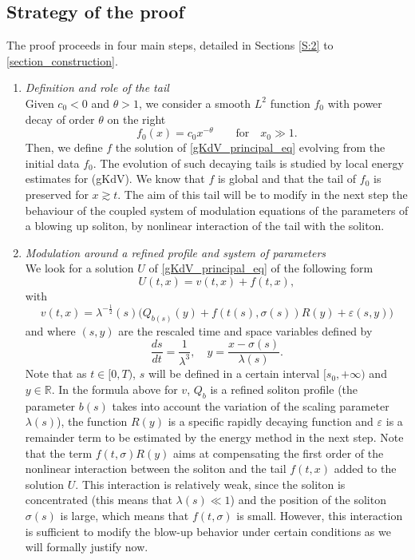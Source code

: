 \documentclass[16pt,english, oneside,reqno]{smfart}
\newcommand{\RR}{\mathbb{R}}
\newcommand{\vare}{{\varepsilon}}
\begin{document}
\subsection{Strategy of the proof}\label{S:strategy}
The proof proceeds in four main steps, detailed in Sections \ref{S:2} to \ref{section_construction}.
\begin{enumerate}
    \item \textit{Definition and role of the tail}\\
    Given $c_0 < 0$ and $\theta > 1$, we consider a smooth $L^2$ function $f_0$ with power decay of order $\theta$ on the right
    \begin{equation}
        f_0(x) = c_0 x^{-\theta} \qquad \text{for}\quad x_0 \gg1.
    \end{equation}
 Then, we define $f$ the solution of \eqref{gKdV_principal_eq} evolving from the initial data $f_0$. The evolution of such decaying tails is studied by local energy estimates for (gKdV). 
 We know that $f$ is global and that the tail of $f_0$ is preserved for $x \gtrsim t$. 
 The aim of this tail will be to modify in the next step the behaviour of the coupled system of modulation equations of the parameters of a blowing up soliton, by nonlinear interaction
 of the tail with the soliton.
 
    \item \textit{Modulation around a refined profile and system of parameters}\\
    We look for a solution $U$ of \eqref{gKdV_principal_eq} of the following form
    \[
    U(t,x) = v(t,x)+f(t,x),
    \]
   with
    \[
    v(t,x)=\lambda^{-\frac 12}(s)\big( Q_{b(s)}(y) + f(t(s),\sigma(s))R(y) + \vare(s,y)\big)
    \]
    and where $(s,y)$ are the rescaled time and space variables defined by
    \begin{equation}
        \frac{ds}{dt} = \frac{1}{\lambda^3},\quad y = \frac{x-\sigma(s)}{\lambda(s)}.
    \end{equation}
    Note that as $t\in [0,T)$, $s$ will be defined in a certain interval $[s_0,+\infty)$
    and $y\in \RR$.
    In the formula above for $v$, $Q_b$ is a refined soliton profile (the parameter $b(s)$ takes into account the variation of the scaling parameter $\lambda(s)$), the function $R(y)$ is a specific rapidly decaying function and $\vare$ is a remainder term to be estimated by the energy method in the next step. 
    Note that the term $f(t,\sigma) R(y)$ aims at compensating the first order of the nonlinear interaction between the soliton and the tail $f(t,x)$ added to the solution $U$. 
    This interaction is relatively weak, since the soliton is concentrated (this means that $\lambda(s)\ll 1$) and the position of the soliton $\sigma(s)$ is large, which means  that $f(t,\sigma)$ is small. 
    However, this interaction is sufficient to
    modify the blow-up behavior under certain conditions as we will formally justify now.
    

\end{enumerate}
\end{document}
